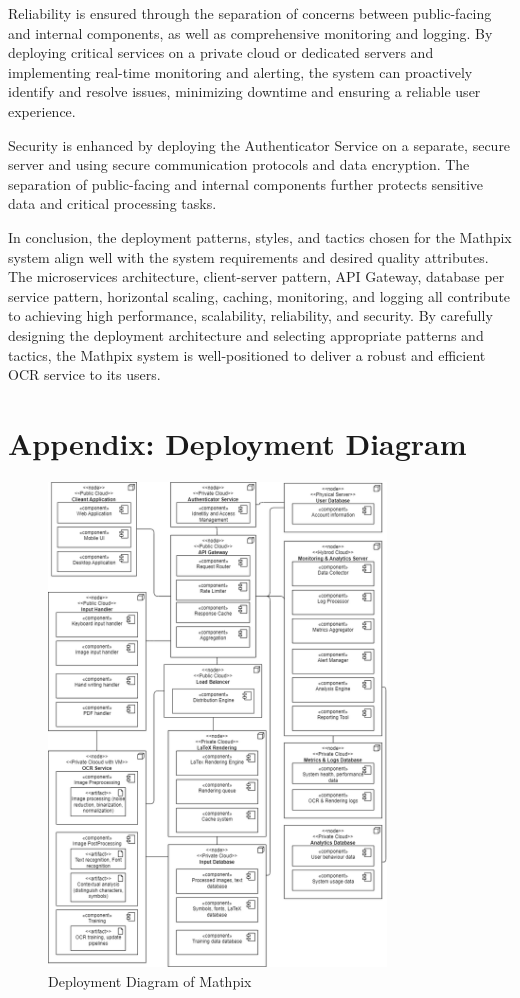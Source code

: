 \documentclass{article}
\begin{document}
Reliability is ensured through the separation of concerns between public-facing and internal components, as well as comprehensive monitoring and logging. By deploying critical services on a private cloud or dedicated servers and implementing real-time monitoring and alerting, the system can proactively identify and resolve issues, minimizing downtime and ensuring a reliable user experience.

Security is enhanced by deploying the Authenticator Service on a separate, secure server and using secure communication protocols and data encryption. The separation of public-facing and internal components further protects sensitive data and critical processing tasks.

In conclusion, the deployment patterns, styles, and tactics chosen for the Mathpix system align well with the system requirements and desired quality attributes. The microservices architecture, client-server pattern, API Gateway, database per service pattern, horizontal scaling, caching, monitoring, and logging all contribute to achieving high performance, scalability, reliability, and security. By carefully designing the deployment architecture and selecting appropriate patterns and tactics, the Mathpix system is well-positioned to deliver a robust and efficient OCR service to its users.

\section{Appendix: Deployment Diagram}
\begin{figure}[H]
    \centering
    \includegraphics[width=0.8\textwidth]{deployment_diagram.png}
    \caption{Deployment Diagram of Mathpix}
    \label{fig:Deployment Diagram of Mathpix}
\end{figure}
\end{document}

